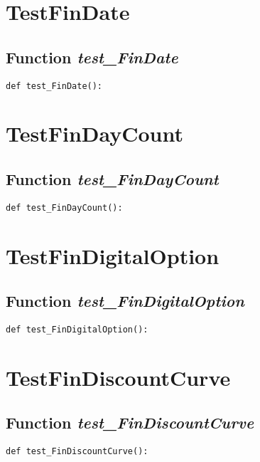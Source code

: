 \documentclass[twoside,11pt]{book}
\begin{document}
\newpage
\section{TestFinDate}

\subsection{Function {\it test\_FinDate}}


\begin{lstlisting}
def test_FinDate():
\end{lstlisting}


\newpage
\section{TestFinDayCount}

\subsection{Function {\it test\_FinDayCount}}


\begin{lstlisting}
def test_FinDayCount():
\end{lstlisting}


\newpage
\section{TestFinDigitalOption}

\subsection{Function {\it test\_FinDigitalOption}}


\begin{lstlisting}
def test_FinDigitalOption():
\end{lstlisting}


\newpage
\section{TestFinDiscountCurve}

\subsection{Function {\it test\_FinDiscountCurve}}


\begin{lstlisting}
def test_FinDiscountCurve():
\end{lstlisting}
\end{document}
